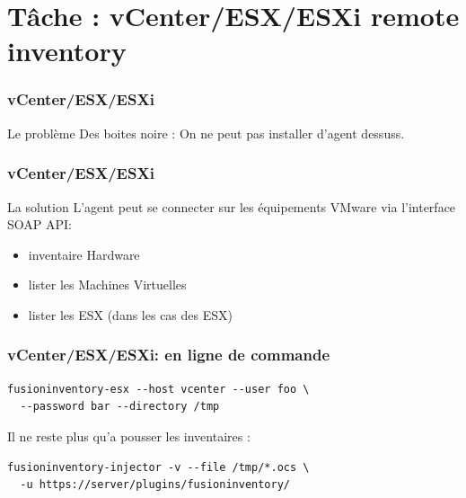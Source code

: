 \documentclass{beamer}
\begin{document}
\section{Tâche : vCenter/ESX/ESXi remote inventory}


\begin{frame}
    \frametitle{vCenter/ESX/ESXi}

    \begin{block}{Le problème}
    Des boites noire : On ne peut pas installer d'agent dessuss.
    \end{block}


\end{frame}

\begin{frame}
    \frametitle{vCenter/ESX/ESXi}

    \begin{block}{La solution}
    L'agent peut se connecter sur les équipements VMware via l'interface SOAP API:
        \begin{itemize}
                \item inventaire Hardware
                \item lister les Machines Virtuelles
                \item lister les ESX (dans les cas des ESX)
        \end{itemize}
    \end{block}

\end{frame}

\begin{frame}[fragile]
    \frametitle{vCenter/ESX/ESXi: en ligne de commande}

\begin{lstlisting}
fusioninventory-esx --host vcenter --user foo \ 
  --password bar --directory /tmp
\end{lstlisting}

Il ne reste plus qu'a pousser les inventaires :
\begin{lstlisting}
fusioninventory-injector -v --file /tmp/*.ocs \ 
  -u https://server/plugins/fusioninventory/
\end{lstlisting}

\end{frame}
\end{document}
